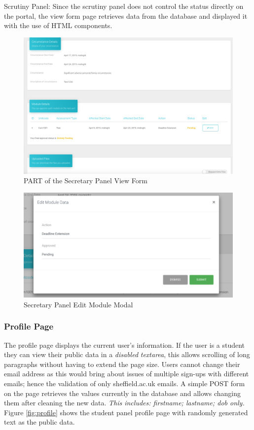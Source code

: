 \documentclass[../main.tex]{subfiles}
\begin{document}
Scrutiny Panel: Since the scrutiny panel does not control the status directly on the portal, the view form page retrieves data from the database and displayed it with the use of HTML components. 

\begin{figure}[H]
        \includegraphics[scale=0.7]
        {images/secviewform.png}
        \caption{\label{fig:secviewform} PART of the Secretary Panel View Form}
      \end{figure}
      
\begin{figure}[H]
        \begin{center}
        \includegraphics[scale=0.7]
        {images/modal.png}
        \caption{\label{fig:modal} Secretary Panel Edit Module Modal}
        \end{center}
      \end{figure}

\subsubsection{Profile Page} 
The profile page displays the current user's information. If the user is a student they can view their public data in a \textit{disabled} \textit{textarea}, this allows scrolling of long paragraphs without having to extend the page size. Users cannot change their email address as this would bring about issues of multiple sign-ups with different emails; hence the validation of only sheffield.ac.uk emails. A simple POST form on the page retrieves the values currently in the database and allows changing them after cleaning the new data. \textit{This includes: firstname; lastname; dob only.} Figure \ref{fig:profile} shows the student panel profile page with randomly generated text as the public data. 
\end{document}
